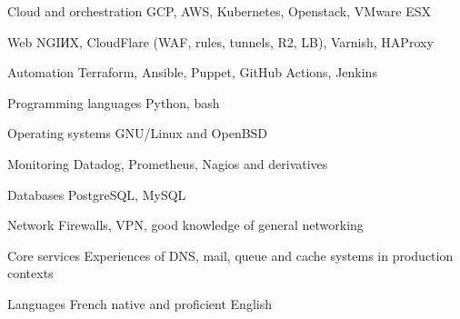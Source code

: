 


\begin{cvskills}


\cvskill
{Cloud and orchestration} %
{GCP, AWS, Kubernetes, Openstack, VMware ESX} %


\cvskill
{Web} %
{NGIИX, CloudFlare (WAF, rules, tunnels, R2, LB), Varnish, HAProxy} %


\cvskill
{Automation} %
{Terraform, Ansible, Puppet, GitHub Actions, Jenkins} %


\cvskill
{Programming languages} %
{Python, bash} %


\cvskill
{Operating systems} %
{GNU/Linux and OpenBSD} %


\cvskill
{Monitoring} %
{Datadog, Prometheus, Nagios and derivatives} %


\cvskill
{Databases} %
{PostgreSQL, MySQL} %


\cvskill
{Network} %
{Firewalls, VPN, good knowledge of general networking} %


\cvskill
{Core services} %
{Experiences of DNS, mail, queue and cache systems in production contexts} %

\cvskill
{Languages} %
{French native and proficient English} %


\end{cvskills}